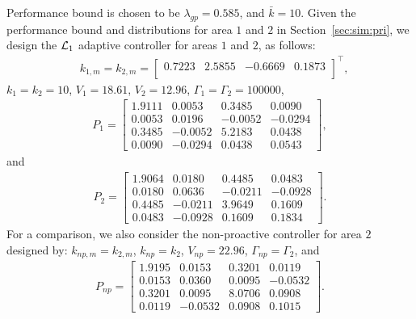 \documentclass[letterpaper, 10 pt, conference]{ieeeconf}
\begin{document}
Performance bound is chosen to be $\lambda_{gp} = 0.585$, and $\bar{k}=10$. Given the performance bound and distributions for area $1$ and $2$ in Section~\ref{sec:sim:pri}, we design the $\mathcal{L}_1$ adaptive controller for areas $1$ and $2$, as follows:
\begin{align*}
    &k_{1,m}=k_{2,m}=
    \left[
    \begin{array}{cccc}
         0.7223& 2.5855& -0.6669& 0.1873  \\
    \end{array}
    \right]^\top,
\end{align*}
$k_{1}=k_{2} = 10$, $V_{1}= 18.61$, $V_{2}= 12.96$, $\Gamma_1= \Gamma_2 = 100000$,
\begin{align*}P_{1} =
\left[
\begin{array}{cccc}
    1.9111 &   0.0053 &  0.3485  &  0.0090\\
    0.0053 &   0.0196 & -0.0052  & -0.0294\\
    0.3485 &  -0.0052 &  5.2183  &  0.0438\\
    0.0090 &  -0.0294 &  0.0438  &  0.0543
    \end{array}
    \right],
\end{align*}
and
\begin{align*}P_{2} =
\left[
\begin{array}{cccc}
    1.9064 &  0.0180  &  0.4485  &  0.0483\\
    0.0180 &  0.0636  & -0.0211  & -0.0928\\
    0.4485 & -0.0211  &  3.9649  &  0.1609\\
    0.0483 & -0.0928  &  0.1609  &  0.1834
    \end{array}
    \right].
\end{align*}
For a comparison, we also consider the non-proactive controller for area $2$ designed by:
$k_{np,m}=k_{2,m}$, $k_{np} = k_2$, $V_{np}= 22.96$, $\Gamma_{np} = \Gamma_2$, and
\begin{align*}P_{np} =
\left[
\begin{array}{cccc}
    1.9195 &   0.0153  &  0.3201  &  0.0119\\
    0.0153 &   0.0360  &  0.0095  & -0.0532\\
    0.3201 &   0.0095  &  8.0706  &  0.0908\\
    0.0119 &  -0.0532  &  0.0908  &  0.1015
    \end{array}
    \right].
\end{align*}
\end{document}
